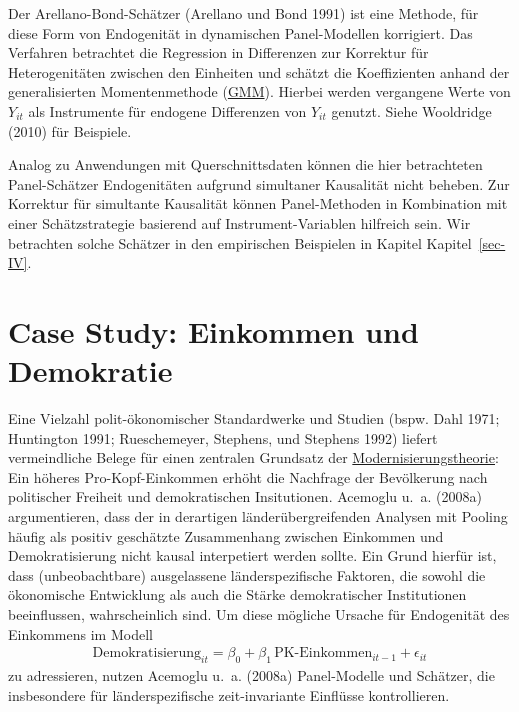 \documentclass[
  a4paper,
  DIV=11,
  oneside]{scrreprt}
\begin{document}
Der Arellano-Bond-Schätzer (Arellano und Bond 1991) ist eine Methode,
für diese Form von Endogenität in dynamischen Panel-Modellen korrigiert.
Das Verfahren betrachtet die Regression in Differenzen zur Korrektur für
Heterogenitäten zwischen den Einheiten und schätzt die Koeffizienten
anhand der generalisierten Momentenmethode
(\href{https://en.wikipedia.org/wiki/Generalized_method_of_moments}{GMM}).
Hierbei werden vergangene Werte von \(Y_{it}\) als Instrumente für
endogene Differenzen von \(Y_{it}\) genutzt. Siehe Wooldridge (2010) für
Beispiele.

Analog zu Anwendungen mit Querschnittsdaten können die hier betrachteten
Panel-Schätzer Endogenitäten aufgrund simultaner Kausalität nicht
beheben. Zur Korrektur für simultante Kausalität können Panel-Methoden
in Kombination mit einer Schätzstrategie basierend auf
Instrument-Variablen hilfreich sein. Wir betrachten solche Schätzer in
den empirischen Beispielen in Kapitel Kapitel~\ref{sec-IV}.

\section{Case Study: Einkommen und
Demokratie}\label{case-study-einkommen-und-demokratie}

Eine Vielzahl polit-ökonomischer Standardwerke und Studien (bspw. Dahl
1971; Huntington 1991; Rueschemeyer, Stephens, und Stephens 1992)
liefert vermeindliche Belege für einen zentralen Grundsatz der
\href{https://de.wikipedia.org/wiki/Modernisierungstheorie}{Modernisierungstheorie}:
Ein höheres Pro-Kopf-Einkommen erhöht die Nachfrage der Bevölkerung nach
politischer Freiheit und demokratischen Insitutionen. Acemoglu u.~a.
(2008a) argumentieren, dass der in derartigen länderübergreifenden
Analysen mit Pooling häufig als positiv geschätzte Zusammenhang zwischen
Einkommen und Demokratisierung nicht kausal interpetiert werden sollte.
Ein Grund hierfür ist, dass (unbeobachtbare) ausgelassene
länderspezifische Faktoren, die sowohl die ökonomische Entwicklung als
auch die Stärke demokratischer Institutionen beeinflussen,
wahrscheinlich sind. Um diese mögliche Ursache für Endogenität des
Einkommens im Modell \begin{align}
  \text{Demokratisierung}_{it} = \beta_0 + \beta_1\,\text{PK-Einkommen}_{it-1} + \epsilon_{it}
\end{align} zu adressieren, nutzen Acemoglu u.~a. (2008a) Panel-Modelle
und Schätzer, die insbesondere für länderspezifische zeit-invariante
Einflüsse kontrollieren.
\end{document}
